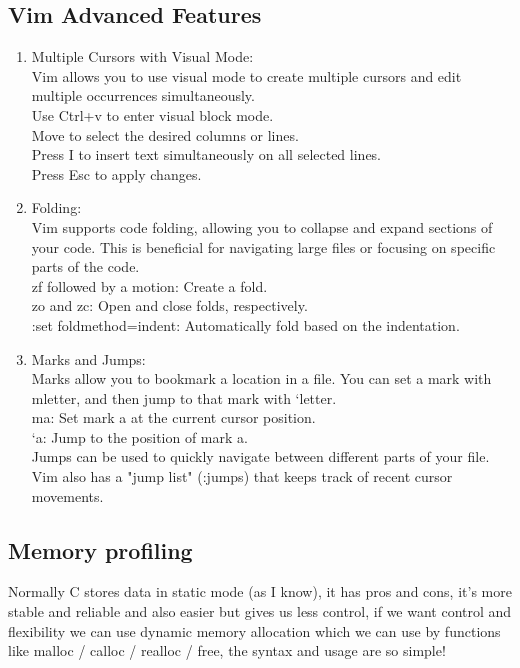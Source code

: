 \documentclass[titlepage]{article}
\begin{document}
\subsection{Vim Advanced Features}
\begin{enumerate}
\item Multiple Cursors with Visual Mode:\\
Vim allows you to use visual mode to create multiple cursors and edit multiple occurrences simultaneously.\\
Use Ctrl+v to enter visual block mode.\\
Move to select the desired columns or lines.\\
Press I to insert text simultaneously on all selected lines.\\
Press Esc to apply changes.
\item Folding:\\
Vim supports code folding, allowing you to collapse and expand sections of your code. This is beneficial for navigating large files or focusing on specific parts of the code.\\
zf followed by a motion: Create a fold.\\
zo and zc: Open and close folds, respectively.\\
:set foldmethod=indent: Automatically fold based on the indentation.\\
\item Marks and Jumps:\\
Marks allow you to bookmark a location in a file. You can set a mark with m{letter}, and then jump to that mark with `{letter}.\\
ma: Set mark a at the current cursor position.\\
`a: Jump to the position of mark a.\\
Jumps can be used to quickly navigate between different parts of your file. Vim also has a "jump list" (:jumps) that keeps track of recent cursor movements.
\end{enumerate}
\subsection{Memory profiling}
Normally C stores data in static mode (as I know), it has pros and cons, it's more stable and reliable and also easier but gives us less control, if we want control and flexibility we can use dynamic memory allocation
which we can use by functions like malloc / calloc / realloc / free, \newline the syntax and usage are so simple!
\end{document}
